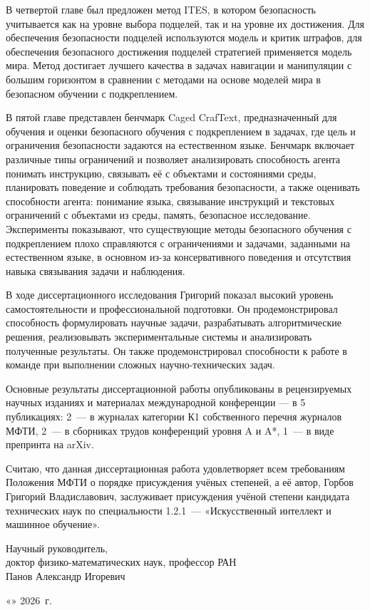 \documentclass[a4paper,14pt]{extarticle}
\begin{document}
В четвертой главе был предложен метод ITES, в котором безопасность учитывается как на уровне выбора подцелей, так и на уровне их достижения. Для обеспечения безопасности подцелей используются модель и критик штрафов, для обеспечения безопасного достижения подцелей стратегией применяется модель мира. Метод достигает лучшего качества в задачах навигации и манипуляции с большим горизонтом в сравнении с методами на основе моделей мира в безопасном обучении с подкреплением.

В пятой главе представлен бенчмарк Caged CrafText, предназначенный для обучения и оценки безопасного обучения с подкреплением в задачах, где цель и ограничения безопасности задаются на естественном языке. Бенчмарк включает различные типы ограничений и позволяет анализировать способность агента понимать инструкцию, связывать её с объектами и состояниями среды, планировать поведение и соблюдать требования безопасности, а также оценивать способности агента: понимание языка, связывание инструкций и текстовых ограничений с объектами из среды, память, безопасное исследование. Эксперименты показывают, что существующие методы безопасного обучения с подкреплением плохо справляются с ограничениями и задачами, заданными на естественном языке, в основном из-за консервативного поведения и отсутствия навыка связывания задачи и наблюдения.

В ходе диссертационного исследования Григорий показал высокий уровень самостоятельности и профессиональной подготовки. Он продемонстрировал способность формулировать научные задачи, разрабатывать алгоритмические решения, реализовывать экспериментальные системы и анализировать полученные результаты. Он также продемонстрировал способности к работе в команде при выполнении сложных научно-технических задач.

Основные результаты диссертационной работы опубликованы в рецензируемых научных изданиях и материалах международной конференции — в 5 публикациях: 2~--- в журналах категории К1 собственного перечня журналов МФТИ, 2~--- в сборниках трудов конференций уровня A и A*, 1~--- в виде препринта на arXiv.

Считаю, что данная диссертационная работа удовлетворяет всем требованиям Положения МФТИ о порядке присуждения учёных степеней, а её автор, Горбов Григорий Владиславович, заслуживает присуждения учёной степени кандидата технических наук по специальности 1.2.1~--- «Искусственный интеллект и машинное обучение».

\vspace{1\baselineskip}
\noindent Научный руководитель,\\
доктор физико-математических наук, профессор РАН\\
Панов Александр Игоревич

\vspace{2\baselineskip}
\noindent «\underline{\hspace{1cm}}» \underline{\hspace{3cm}} 2026~г.
\end{document}
